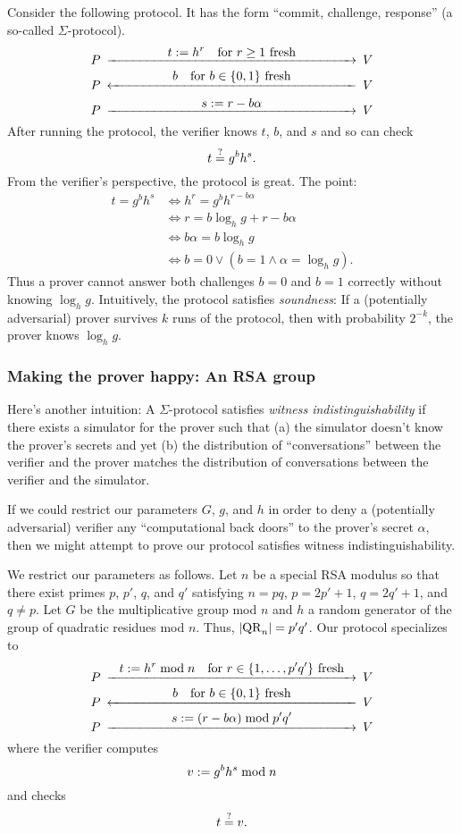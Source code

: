 Consider the following protocol. It has the form ``commit,
challenge, response'' (a so-called $\Sigma$-protocol).
\[
	\minCDarrowwidth200pt
	\begin{CD}
	P	@>{\displaystyle t \defeq h^r	\quad\text{for $r \ge 1$ fresh}}>>	V \\
	P	@<{\displaystyle b	\quad\text{for $b \in \sset{0, 1}$ fresh}}<<	V \\
	P	@>{\displaystyle s \defeq r - b\alpha}>>	V
	\end{CD}
\]
After running the protocol, the verifier knows $t$, $b$, and $s$
and so can check
$$
	t \mathrel{\overset{\mathrm{?}}{=}} g^b h^s.
$$
From the verifier's perspective, the protocol is great. The
point:
\begin{align*}
	t = g^b h^s &\iff h^r = g^b h^{r - b\alpha} \\
	&\iff r = b \log_h g + r - b\alpha \\
	&\iff b\alpha = b \log_h g \\
	&\iff b = 0 \lor (b = 1 \land \alpha = \log_h g).
\end{align*}
Thus a prover cannot answer both challenges $b = 0$ and $b = 1$
correctly without knowing $\log_h g$. Intuitively, the protocol
satisfies \emph{soundness}: If a (potentially adversarial) prover
survives $k$ runs of the protocol, then with probability $2^{-k}$,
the prover knows $\log_h g$.

\subsubsection{Making the prover happy: An RSA group}

Here's another intuition: A $\Sigma$-protocol satisfies \emph{witness
indistinguishability} if there exists a simulator for the
prover such that (a) the simulator doesn't know the prover's
secrets and yet (b) the distribution of ``conversations''
between the verifier and the prover matches the distribution
of conversations between the verifier and the simulator.

If we could restrict our parameters $G$, $g$, and $h$ in order to
deny a (potentially adversarial) verifier any ``computational
back doors'' to the prover's secret $\alpha$, then we might attempt to
prove our protocol satisfies witness
indistinguishability.

We restrict our parameters as follows.
Let $n$ be a special RSA modulus so that
there exist primes $p$, $p'$, $q$, and $q'$ satisfying
$n = pq$, $p = 2p' + 1$, $q = 2q' + 1$, and $q \not= p$.
Let $G$ be the multiplicative group mod $n$
and $h$ a random generator of the group of quadratic
residues mod $n$.
Thus, $\lvert{\mathrm{QR}_n}\rvert = p'q'$. Our protocol specializes to
\[
	\minCDarrowwidth200pt
	\begin{CD}
	P	@>{\displaystyle t \defeq h^r \bmod n	\quad\text{for $r \in \sset{1, \ldots, p'q'}$ fresh}}>>	V \\
	P	@<{\displaystyle b	\quad\text{for $b \in \sset{0, 1}$ fresh}}<<	V \\
	P	@>{\displaystyle s \defeq (r - b\alpha) \bmod p'q'}>>	V
	\end{CD}
\]
where the verifier computes
\[
	v \mathrel{:=} g^b h^s \bmod n
\]
and checks
\[
	t \mathrel{\overset{\mathrm{?}}{=}} v.
\]

